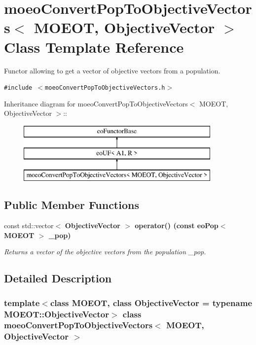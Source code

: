 \section{moeo\-Convert\-Pop\-To\-Objective\-Vectors$<$ MOEOT, Objective\-Vector $>$ Class Template Reference}
\label{classmoeoConvertPopToObjectiveVectors}
Functor allowing to get a vector of objective vectors from a population.  


{\tt \#include $<$moeo\-Convert\-Pop\-To\-Objective\-Vectors.h$>$}

Inheritance diagram for moeo\-Convert\-Pop\-To\-Objective\-Vectors$<$ MOEOT, Objective\-Vector $>$::\begin{figure}[H]
\begin{center}
\leavevmode
\includegraphics[height=3cm]{classmoeoConvertPopToObjectiveVectors}
\end{center}
\end{figure}
\subsection*{Public Member Functions}
\begin{CompactItemize}
\item 
const std::vector$<$ \bf{Objective\-Vector} $>$ \bf{operator()} (const \bf{eo\-Pop}$<$ MOEOT $>$ \_\-pop)
\begin{CompactList}\small\item\em Returns a vector of the objective vectors from the population \_\-pop. \item\end{CompactList}\end{CompactItemize}


\subsection{Detailed Description}
\subsubsection*{template$<$class MOEOT, class Objective\-Vector = typename MOEOT::Objective\-Vector$>$ class moeo\-Convert\-Pop\-To\-Objective\-Vectors$<$ MOEOT, Objective\-Vector $>$}

